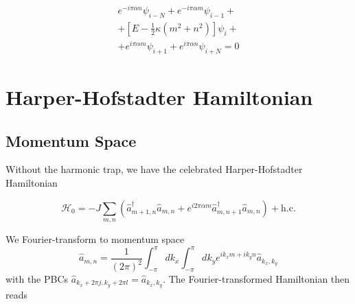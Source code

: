 \documentclass[a4paper,prb,10pt,aps,twocolumn]{revtex4-1}
\begin{document}
\begin{multline}
  \label{eq:17}
  e^{-i \pi \alpha n}\psi_{i-N} + e^{-i \pi \alpha m} \psi_{i-1} +\\
  +\left[E- \frac{1}{2} \kappa (m^2+n^2)\right] \psi_i +\\
  + e^{i \pi \alpha m} \psi_{i+1} + e^{i \pi \alpha n}\psi_{i+N} = 0
\end{multline}

\section{Harper-Hofstadter Hamiltonian}
\subsection{Momentum Space}
Without the harmonic trap, we have the celebrated Harper-Hofstadter Hamiltonian

\begin{equation}
  \label{eq:16}
  \mathcal{H}_0=-J\sum_{m,n}(\hat{a}_{m+1,n}^{\dagger}\hat{a}_{m,n}+e^{i2\pi\alpha m}\hat{a}_{m,n+1}^{\dagger}\hat{a}_{m,n}) + \text{h.c.}
\end{equation}

We Fourier-transform to momentum space
\begin{equation}
  \label{eq:18}
  \hat{a}_{m,n} = \frac{1}{(2\pi)^2}\int_{-\pi}^{\pi}dk_x\int_{-\pi}^{\pi}dk_y e^{i k_x m + i k_y n} \hat{a}_{k_x,k_y}
\end{equation}
with the PBCs $\hat{a}_{k_x+2\pi j, k_y+2\pi l} = \hat{a}_{k_x, k_y}$. The Fourier-transformed Hamiltonian then reads
\end{document}
